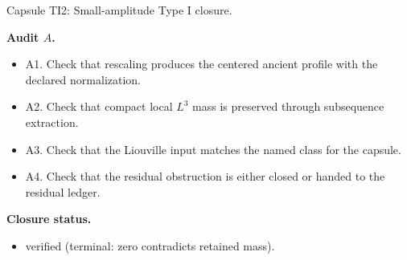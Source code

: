 \documentclass[11pt]{amsart}
\newcommand{\capsulefield}[1]{\par\smallskip\noindent\textbf{#1.}\ }
\begin{document}
\begin{proofcapsule}{Capsule TI2: Small-amplitude Type I closure.}
  \capsulefield{Audit \(A\)}
  \begin{itemize}[leftmargin=1.8em]
  \item A1. Check that rescaling produces the centered ancient profile with the declared normalization.
  \item A2. Check that compact local $L^3$ mass is preserved through subsequence extraction.
  \item A3. Check that the Liouville input matches the named class for the capsule.
  \item A4. Check that the residual obstruction is either closed or handed to the residual ledger.
  \end{itemize}
  \capsulefield{Closure status}
  \begin{itemize}[leftmargin=1.8em]
  \item verified (terminal: zero contradicts retained mass).
  \end{itemize}
\end{proofcapsule}
\end{document}

